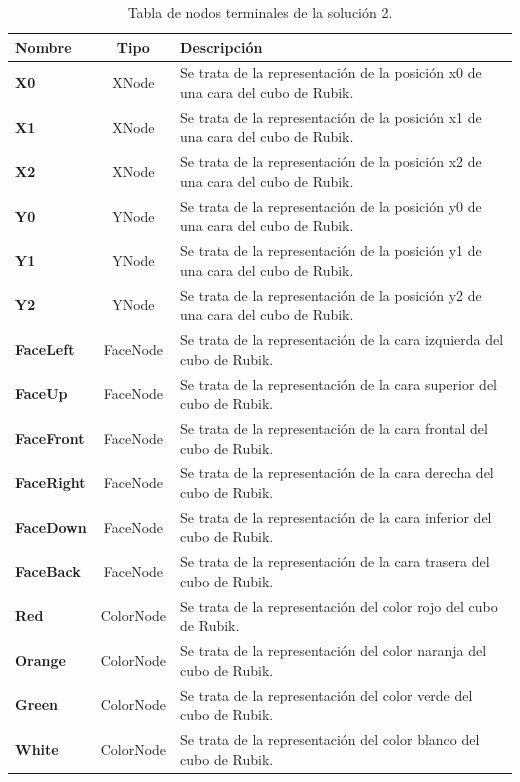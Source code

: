 \begin{table}[ctb]
\caption{Tabla de nodos terminales de la solución 2.}
\label{tab:n-terminales-sol2}
\centering
\begin{tabular}{lcp{8cm}}
\toprule
\textbf{Nombre} &\textbf{Tipo}& \textbf{Descripción}\\
\midrule
\textbf{X0}	&XNode&	Se trata de la representación de la posición x0 de una cara
del cubo de Rubik.\\\hline
\textbf{X1}	&XNode&	Se trata de la representación de la posición x1 de
una cara del cubo de Rubik.\\\hline
\textbf{X2}&	XNode&	Se trata de la representación de la
posición x2 de una cara del cubo de Rubik.\\\hline
\textbf{Y0}&	YNode&	Se trata de la
representación de la posición y0 de una cara del cubo de Rubik.\\\hline
\textbf{Y1}&YNode	&Se trata de la representación de la posición y1 de una cara
del cubo de Rubik.\\\hline
\textbf{Y2}&	YNode	&Se trata de la representación de la posición y2 de una cara
del cubo de Rubik.\\\hline
\textbf{FaceLeft}&	FaceNode	&Se trata de la representación de la cara izquierda
del cubo de Rubik.\\\hline
\textbf{FaceUp}&	FaceNode&	Se trata de la representación de la cara superior del
cubo de Rubik.\\\hline
\textbf{FaceFront}&	FaceNode &	Se trata de la representación de la cara frontal
del cubo de Rubik.\\\hline
\textbf{FaceRight}&	FaceNode&	Se trata de la representación de la cara derecha
del cubo de Rubik.\\\hline 
\textbf{FaceDown}&	FaceNode&	Se trata de la representación de la cara inferior
del cubo de Rubik.\\\hline
\textbf{FaceBack}	&FaceNode	&Se trata de la representación de la cara trasera
del cubo de Rubik.\\\hline
\textbf{Red}	&ColorNode&	Se trata de la representación del color rojo del cubo
de Rubik.\\\hline 
\textbf{Orange}&	ColorNode &	Se trata de la representación del color naranja del
cubo de Rubik.\\\hline 
\textbf{Green}	&ColorNode&	Se trata de la representación del color verde del
cubo de Rubik.\\\hline 
\textbf{White}	&ColorNode&	Se trata de la representación del color blanco del
cubo de Rubik.\\\hline 

\end{tabular}
\end{table}
